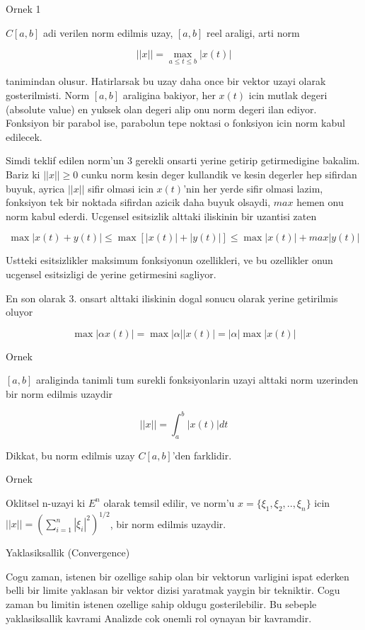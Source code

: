\documentclass[12pt,fleqn]{article}\usepackage{../common}
\begin{document}
Ornek 1

$C[a,b]$ adi verilen norm edilmis uzay, $[a,b]$ reel araligi, arti norm

\[ ||x|| = \max_{a \le t \le b} |x(t)| \]

tanimindan olusur. Hatirlarsak bu uzay daha once bir vektor uzayi olarak
gosterilmisti. Norm $[a,b]$ araligina bakiyor, her $x(t)$ icin mutlak degeri
(absolute value) en yuksek olan degeri alip onu norm degeri ilan
ediyor. Fonksiyon bir parabol ise, parabolun tepe noktasi o fonksiyon icin
norm kabul edilecek. 

Simdi teklif edilen norm'un 3 gerekli onsarti yerine getirip getirmedigine
bakalim. Bariz ki $||x|| \ge 0$ cunku norm kesin deger kullandik ve kesin
degerler hep sifirdan buyuk, ayrica $||x||$ sifir olmasi icin $x(t)$'nin
her yerde sifir olmasi lazim, fonksiyon tek bir noktada sifirdan azicik
daha buyuk olsaydi, $max$ hemen onu norm kabul ederdi. Ucgensel esitsizlik
alttaki iliskinin bir uzantisi zaten

\[ 
\max |x(t) + y(t)| \le 
\max [|x(t)| + |y(t)|] \le
\max |x(t)| + max |y(t)|
\]

Ustteki esitsizlikler maksimum fonksiyonun ozellikleri, ve bu ozellikler
onun ucgensel esitsizligi de yerine getirmesini sagliyor. 

En son olarak 3. onsart alttaki iliskinin dogal sonucu olarak yerine
getirilmis oluyor 

\[ \max |\alpha x(t)|  = \max |\alpha||x(t)| = |\alpha| \max |x(t)|  \]

Ornek

$[a,b]$ araliginda tanimli tum surekli fonksiyonlarin uzayi alttaki norm
uzerinden bir norm edilmis uzaydir

\[ ||x|| = \int _{ a}^{b} |x(t)|dt \]

Dikkat, bu norm edilmis uzay $C[a,b]$'den farklidir. 

Ornek 

Oklitsel n-uzayi ki $E^n$ olarak temsil edilir, ve norm'u $x = \{ \xi_1,
\xi_2, .., \xi_n\}$ 
icin $||x|| = (\sum _{ i=1}^{n} |\xi_i|^2)^{1/2}$, bir norm edilmis uzaydir. 

Yaklasiksallik (Convergence)

Cogu zaman, istenen bir ozellige sahip olan bir vektorun varligini ispat
ederken belli bir limite yaklasan bir vektor dizisi yaratmak yaygin bir
tekniktir. Cogu zaman bu limitin istenen ozellige sahip oldugu
gosterilebilir. Bu sebeple yaklasiksallik kavrami Analizde cok onemli rol
oynayan bir kavramdir. 
\end{document}
